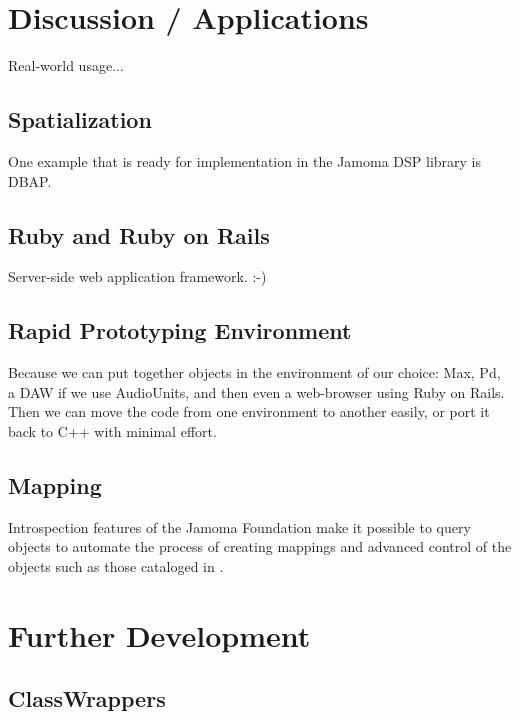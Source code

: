 \documentclass[twoside,10pt]{article}
\begin{document}
\section{Discussion / Applications} %

Real-world usage...

\subsection{Spatialization}

One example that is ready for implementation in the Jamoma DSP library is DBAP\cite{Lossius:2009}.


\subsection{Ruby and Ruby on Rails}

Server-side web application framework.  :-)

\subsection{Rapid Prototyping Environment}

Because we can put together objects in the environment of our choice: Max, Pd, a DAW if we use AudioUnits, and then even a web-browser using Ruby on Rails.  Then we can move the code from one environment to another easily, or port it back to C++ with minimal effort.

\subsection{Mapping}

Introspection features of the Jamoma Foundation make it possible to query objects to automate the process of creating mappings and advanced control of the objects such as those cataloged in \cite{Pendharkar:2006}.  




\section{Further Development} %


\subsection{ClassWrappers}
\end{document}
